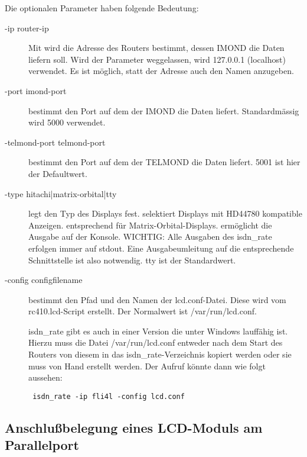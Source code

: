 Die optionalen Parameter haben folgende Bedeutung:

\begin{description}
\item[-ip router-ip]

        Mit  wird die Adresse des Routers bestimmt, dessen IMOND die Daten liefern soll.
        Wird der Parameter weggelassen, wird 127.0.0.1 (localhost) verwendet.
        Es ist möglich, statt der Adresse auch den Namen anzugeben.
        
\item[-port imond-port]
         bestimmt den Port auf dem der IMOND die Daten liefert.          
        Standardmässig wird 5000 verwendet.
        
\item[-telmond-port telmond-port]
         bestimmt den Port auf dem der TELMOND die Daten liefert.
        5001 ist hier der Defaultwert.
        
\item[-type hitachi|matrix-orbital|tty]
         legt den Typ des Displays fest.
         selektiert Displays mit HD44780 kompatible Anzeigen.
         entsprechend für Matrix-Orbital-Displays.
         ermöglicht die Ausgabe auf der Konsole.
        WICHTIG: Alle Ausgaben des isdn\_rate erfolgen immer auf stdout. Eine
        Ausgabeumleitung auf die entsprechende Schnittstelle ist also notwendig.
        tty ist der Standardwert.

\item[-config configfilename]
         bestimmt den Pfad und den Namen der lcd.conf-Datei. Diese wird vom
        rc410.lcd-Script erstellt. Der Normalwert ist /var/run/lcd.conf.
        
isdn\_rate gibt es auch in einer Version die unter Windows lauffähig ist. Hierzu muss die Datei 
/var/run/lcd.conf entweder nach dem Start des Routers von diesem in das isdn\_rate-Verzeichnis kopiert werden
oder sie muss von Hand erstellt werden.
Der Aufruf könnte dann wie folgt aussehen:
\begin{example}
\begin{verbatim}
 isdn_rate -ip fli4l -config lcd.conf
\end{verbatim}
\end{example}
               
\end{description}

\subsection{Anschlußbelegung eines LCD-Moduls am Parallelport}
 
